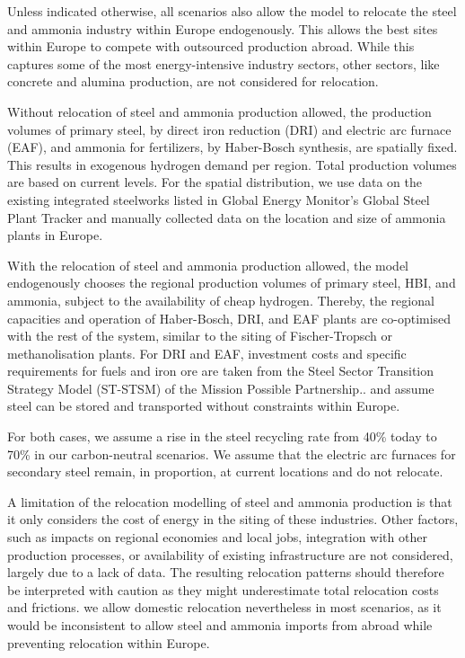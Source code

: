 Unless indicated otherwise, all scenarios also allow the model to relocate the
steel and ammonia industry within Europe endogenously. This allows the best
sites within Europe to compete with outsourced production abroad. While this
captures some of the most energy-intensive industry sectors, other sectors, like
concrete and alumina production, are not considered for relocation.

Without relocation of steel and ammonia production allowed, the production
volumes of primary steel, by direct iron reduction (DRI) and electric arc
furnace (EAF), and ammonia for fertilizers, by Haber-Bosch synthesis, are
spatially fixed. This results in exogenous hydrogen demand per region. Total
production volumes are based on current
levels.\cite{unitedstatesgeologicalsurveyAmmoniaProductionCountry2022,europeancommission.jointresearchcentre.JRCIDEES2021IntegratedDatabase2024}
For the spatial distribution, we use data on the existing integrated steelworks
listed in Global Energy Monitor's Global Steel Plant Tracker
\cite{globalenergymonitorGlobalSteelPlant2024} and manually collected data on
the location and size of ammonia plants in Europe.

With the relocation of steel and ammonia production allowed, the model
endogenously chooses the regional production volumes of primary steel, HBI, and
ammonia, subject to the availability of cheap hydrogen. Thereby, the regional
capacities and operation of Haber-Bosch, DRI, and EAF plants are co-optimised
with the rest of the system, similar to the siting of Fischer-Tropsch or
methanolisation plants. For DRI and EAF, investment costs and specific
requirements for fuels and iron ore are taken from the Steel Sector Transition
Strategy Model (ST-STSM) of the Mission Possible
Partnership.\cite{missionpossiblepartnershipSteelSectorTransition2022,missionpossiblepartnershipMakingNetZeroSteel2022}.
and assume steel can be stored and transported without constraints within
Europe. 

For both cases, we assume a rise in the steel recycling rate from 40\% today to
70\% in our carbon-neutral
scenarios.\cite{materialeconomicsIndustrialTransformation20502019} We assume
that the electric arc furnaces for secondary steel remain, in proportion, at
current locations and do not relocate.

A limitation of the relocation modelling of steel and ammonia production is that
it only considers the cost of energy in the siting of these industries. Other
factors, such as impacts on regional economies and local jobs, integration with
other production processes, or availability of existing infrastructure are not
considered, largely due to a lack of data. The resulting relocation patterns
should therefore be interpreted with caution as they might underestimate total
relocation costs and frictions. we allow domestic relocation nevertheless in
most scenarios, as it would be inconsistent to allow steel and ammonia imports
from abroad while preventing relocation within Europe.

